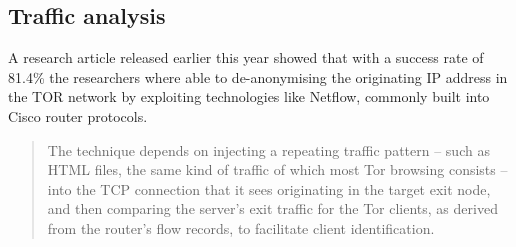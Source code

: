 \subsection{Traffic analysis}
A research article released earlier this year showed that with a success rate of 81.4\% the researchers where able to de-anonymising the originating IP address in the TOR network by exploiting technologies like Netflow, commonly built into Cisco router protocols.~\cite{torrouter}~\cite{traffic_analysis}
\begin{quote} 
The technique depends on injecting a repeating traffic pattern – such as HTML files, the same kind of traffic of which most Tor browsing consists – into the TCP connection that it sees originating in the target exit node, and then comparing the server’s exit traffic for the Tor clients, as derived from the router’s flow records, to facilitate client identification.~\cite{torrouter}
\end{quote}




